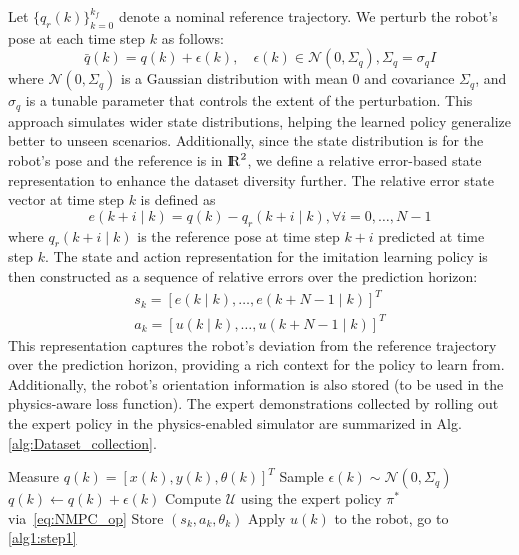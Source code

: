 \documentclass[letterpaper, 10 pt, conference]{ieeeconf}
\newcommand{\rr}{\mathop{{\rm I}\mskip-4.0mu{\rm R}}\nolimits}
\begin{document}
Let $\{q_r(k)\}_{k=0}^{k_f}$ denote a nominal reference trajectory. We perturb the robot's pose at each time step $k$ as follows:
\begin{equation}
  \bar{q}(k) = q(k) + \epsilon(k), \quad \epsilon(k) \in \mathcal{N}(0, \Sigma_q), \Sigma_q = \sigma_q I
\end{equation}
where $\mathcal{N}(0, \Sigma_q)$ is a Gaussian distribution with mean $0$ and covariance $\Sigma_q$, and $\sigma_q$ is a tunable parameter that controls the extent of the perturbation.
This approach simulates wider state distributions, helping the learned policy generalize better to unseen scenarios.
%
Additionally, since the state distribution is for the robot's pose and the reference is in $\rr^2$, we define a relative error-based state representation to enhance the dataset diversity further. The relative error state vector at time step $k$ is defined as
\begin{equation}\label{eq:relative_error}
  e(k+i \mid k) = q(k)-q_r(k+i \mid k), \forall i=0,\dots,N-1
\end{equation}
where $q_r(k+i \mid k)$ is the reference pose at time step $k+i$ predicted at time step $k$. The state and action representation for the imitation learning policy is then constructed as a sequence of relative errors over the prediction horizon:
\begin{equation}
  \label{eq:state_action_representation}
  \begin{array}{c}
    s_k = [e(k \mid k),\dots, e(k+N-1 \mid k)]^T \\
    a_k = [u(k\mid k), \dots, u(k+N-1\mid k)]^T
  \end{array}
\end{equation}
This representation captures the robot's deviation from the reference trajectory over the prediction horizon, providing a rich context for the policy to learn from. Additionally, the robot's orientation information is also stored (to be used in the physics-aware loss function). The expert demonstrations collected by rolling out the expert policy in the physics-enabled simulator are summarized in Alg. \ref{alg:Dataset_collection}.
\begin{algorithm}[!ht]
  \caption{Expert Policy Rollouts}\label{alg:Dataset_collection}
  \vspace{0.1cm}
  \begin{algorithmic}[1]
    \State Measure $q(k)=[x(k),y(k),\theta(k)]^T$ \label{alg1:step1}
    \State Sample $\epsilon(k) \sim \mathcal{N}(0, \Sigma_q)$
    \State $q(k) \gets q(k) + \epsilon(k)$
    \EndIf
    \State Compute $\mathcal{U}$ using the expert policy $\pi^*$ via~\eqref{eq:NMPC_op}
    \State Store $(s_k, a_k, \theta_k)$
    \State Apply $u(k)$ to the robot, go to \ref{alg1:step1}
  \end{algorithmic}
\end{algorithm}
\end{document}
